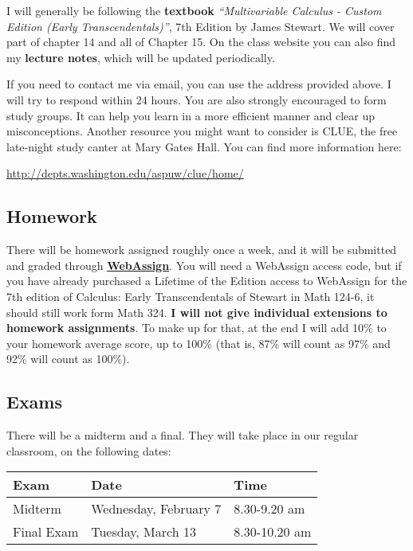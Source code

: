 \documentclass[11pt]{article}
\begin{document}
I will generally be following the \textbf{textbook} \emph{``Multivariable Calculus - Custom Edition (Early Transcendentals)''}, 7th Edition by James Stewart. We will cover part of chapter 14 and all of Chapter 15. On the class website you can also find my \textbf{lecture notes}, which will be updated periodically.

 If you need to contact me via email, you can use the address provided above. I will try to respond within 24 hours. You are also strongly encouraged to form study groups. It can help you learn in a more efficient manner and clear up misconceptions. Another resource you might want to consider is CLUE, the free late-night study canter at Mary Gates Hall. You can find more information here: \begin{center}
 \url{http://depts.washington.edu/aspuw/clue/home/}
 \end{center}
\vspace{1mm}
\subsection*{Homework}

There will be homework assigned roughly once a week, and it will be submitted and graded through \href{https://www.webassign.net/washington/login.html}{\textbf{WebAssign}}. You will need a WebAssign access code, but if you have already purchased a Lifetime of the Edition access to WebAssign for the 7th edition of Calculus: Early Transcendentals of Stewart in Math 124-6, it should still work form Math 324. \textbf{I will not give individual extensions to homework assignments}. To make up for that, at the end I will add 10\% to your homework average score, up to 100\% (that is, 87\% will count as 97\% and 92\% will count as 100\%).

\vspace{1mm}
\subsection*{Exams}

There will be a midterm and a final. They will take place in our regular classroom, on the following dates:
\begin{center}
\begin{tabular}{|l |l |l|}
  \hline
  \textbf{Exam} & \textbf{Date} & \textbf{Time}\\
  \hline
  Midterm & Wednesday, February 7 & 8.30-9.20 am\\
  \hline
  Final Exam & Tuesday, March 13 	& 8.30-10.20 am\\
  \hline
\end{tabular}
\end{center}
\end{document}
